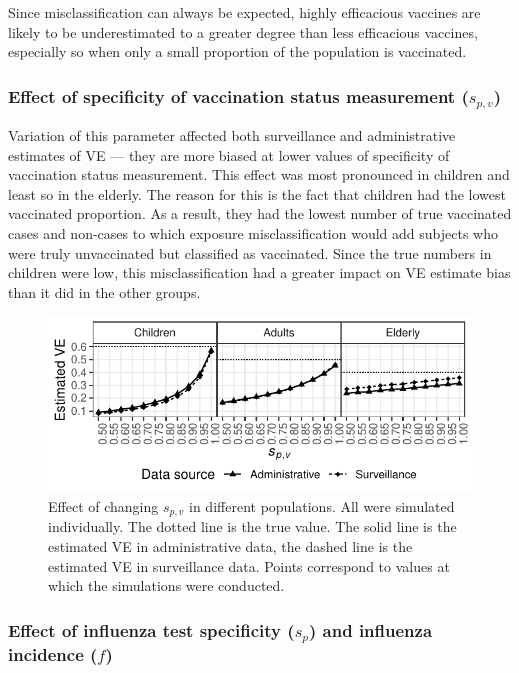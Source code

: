 \documentclass[11pt]{article}
\begin{document}
Since misclassification can always be expected, highly efficacious vaccines are likely to be underestimated to a greater degree than less efficacious vaccines, especially so when only a small proportion of the population is vaccinated.

\subsubsection{Effect of specificity of vaccination status measurement ($s_{p,v}$)}

Variation of this parameter affected both surveillance and administrative estimates of VE --- they are more biased at lower values of specificity of vaccination status measurement. This effect was most pronounced in children and least so in the elderly. The reason for this is the fact that children had the lowest vaccinated proportion. As a result, they had the lowest number of true vaccinated cases and non-cases to which exposure misclassification would add subjects who were truly unvaccinated but classified as vaccinated. Since the true numbers in children were low, this misclassification had a greater impact on VE estimate bias than it did in the other groups.

\pagebreak

\begin{figure}[h]
	\centering
		\includegraphics[width=0.75\linewidth]{../fig-agesind/agesind-spec_vac.pdf}
		\caption{
Effect of changing $s_{p,v}$ in different populations. All were simulated individually. The dotted line is the true value. The solid line is the estimated VE in administrative data, the dashed line is the estimated VE in surveillance data. Points correspond to values at which the simulations were conducted. \label{fig:agesind-spv}
		}
\end{figure}

\subsubsection{Effect of influenza test specificity ($s_p$) and influenza incidence ($f$)}
\end{document}

